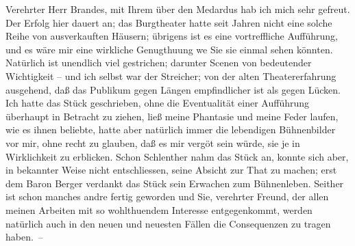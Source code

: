 \pstart{}Verehrter Herr Brandes,\pend\vspace{0.5em}
\pstart
           mit Ihrem \label{K_L02000-1v}\label{K_L02000-1} über den Medardus hab ich mich
               sehr gefreut. Der Erfolg hier dauert an; das Burgtheater hatte seit Jahren nicht eine solche Reihe von ausverkauften
               Häusern; übrigens ist es eine vortreffliche Aufführung, und es wäre mir eine
               wirkliche Genugthuung we{\geminationn} Sie sie einmal sehen könnten.
               Natürlich ist unendlich viel gestrichen; darunter Scenen von bedeutender Wichtigkeit
               – und ich selbst war der Streicher; von der alten Theatererfahrung ausgehend, daß das
               Publikum gegen Längen empfindlicher ist als gegen Lücken. Ich hatte das Stück
               geschrieben, ohne die Eventualität einer Aufführung überhaupt in Betracht zu ziehen,
               ließ meine Phantasie und meine Feder laufen, wie es ihnen beliebte, {\pb}hatte aber natürlich immer die lebendigen
               Bühnenbilder vor mir, ohne recht zu glauben, daß es mir vergö{\geminationn}t sein würde, sie je in Wirklichkeit zu erblicken.
               Schon Schlenther nahm das Stück an, konnte sich aber, in bekannter
               Weise nicht entschliessen, seine Absicht zur That zu machen; erst dem Baron Berger verdankt  das Stück sein
               Erwachen zum Bühnenleben. Seither ist schon manches andre fertig geworden und Sie,
               verehrter Freund, der allen meinen Arbeiten mit so wohlthuendem Interesse
               entgegenkommt, werden natürlich auch in den neuen und neuesten Fällen die
               Consequenzen zu tragen haben. –\pend
           
